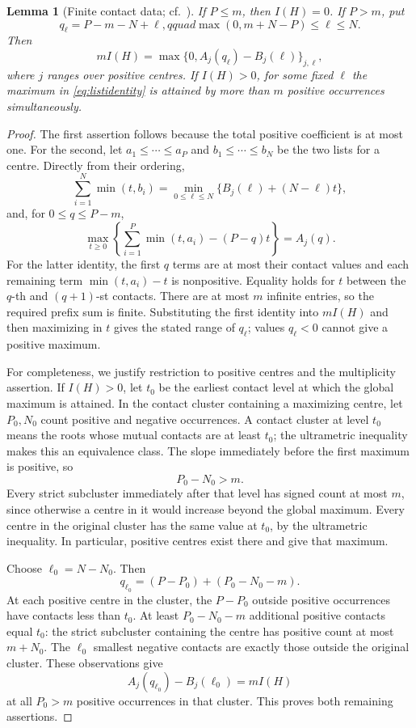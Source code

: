 \documentclass[11pt,reqno]{amsart}
\numberwithin{equation}{section}
\newtheorem{lemma}[theorem]{Lemma}
\theoremstyle{definition}
\theoremstyle{remark}
\begin{document}
\begin{lemma}[Finite contact data; cf.\ {\cite[Lemma~4.2]{Jiao}}]\label{lem:lists}
If $P\le m$, then $I(H)=0$. If $P>m$, put
\[
 q_\ell=P-m-N+\ell,qquad
 \max(0,m+N-P)\le\ell\le N.
\]
Then
\begin{equation}\label{eq:listidentity}
 mI(H)=\max\{0,A_j(q_\ell)-B_j(\ell)\}_{j,\ell},
\end{equation}
where $j$ ranges over positive centres. If $I(H)>0$, for some fixed $\ell$ the maximum in \eqref{eq:listidentity} is attained by more than $m$ positive occurrences simultaneously.
\end{lemma}
\begin{proof}
The first assertion follows because the total positive coefficient is at most one. For the second, let $a_1\le\cdots\le a_P$ and $b_1\le\cdots\le b_N$ be the two lists for a centre. Directly from their ordering,
\[
 \sum_{i=1}^N\min(t,b_i)
 =\min_{0\le\ell\le N}\{B_j(\ell)+(N-\ell)t\},
\]
and, for $0\le q\le P-m$,
\[
 \max_{t\ge0}\left\{\sum_{i=1}^P\min(t,a_i)-(P-q)t\right\}
 =A_j(q).
\]
For the latter identity, the first $q$ terms are at most their contact values and each remaining term $\min(t,a_i)-t$ is nonpositive. Equality holds for $t$ between the $q$-th and $(q+1)$-st contacts. There are at most $m$ infinite entries, so the required prefix sum is finite. Substituting the first identity into $mI(H)$ and then maximizing in $t$ gives the stated range of $q_\ell$; values $q_\ell<0$ cannot give a positive maximum.

For completeness, we justify restriction to positive centres and the multiplicity assertion. If $I(H)>0$, let $t_0$ be the earliest contact level at which the global maximum is attained. In the contact cluster containing a maximizing centre, let $P_0,N_0$ count positive and negative occurrences. A contact cluster at level $t_0$ means the roots whose mutual contacts are at least $t_0$; the ultrametric inequality makes this an equivalence class. The slope immediately before the first maximum is positive, so
\[
 P_0-N_0>m.
\]
Every strict subcluster immediately after that level has signed count at most $m$, since otherwise a centre in it would increase beyond the global maximum. Every centre in the original cluster has the same value at $t_0$, by the ultrametric inequality. In particular, positive centres exist there and give that maximum.

Choose $\ell_0=N-N_0$. Then
\[
 q_{\ell_0}=(P-P_0)+(P_0-N_0-m).
\]
At each positive centre in the cluster, the $P-P_0$ outside positive occurrences have contacts less than $t_0$. At least $P_0-N_0-m$ additional positive contacts equal $t_0$: the strict subcluster containing the centre has positive count at most $m+N_0$. The $\ell_0$ smallest negative contacts are exactly those outside the original cluster. These observations give
\[
 A_j(q_{\ell_0})-B_j(\ell_0)=mI(H)
\]
at all $P_0>m$ positive occurrences in that cluster. This proves both remaining assertions.
\end{proof}
\end{document}
